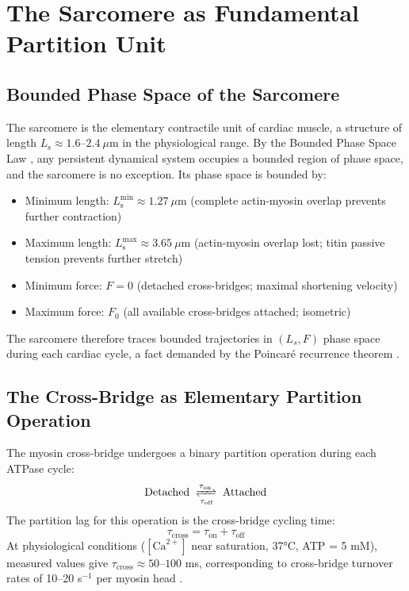 \documentclass[12pt,a4paper]{article}
\theoremstyle{remark}
\newcommand{\taucross}{\tau_{\mathrm{cross}}}
\newcommand{\Ls}{L_{\mathrm{s}}}
\begin{document}
\section{The Sarcomere as Fundamental Partition Unit}
\label{sec:sarcomere}

\subsection{Bounded Phase Space of the Sarcomere}

The sarcomere is the elementary contractile unit of cardiac muscle, a structure of length $\Ls \approx 1.6$--$2.4~\mu\mathrm{m}$ in the physiological range. By the Bounded Phase Space Law \cite{sachikonye2024mass}, any persistent dynamical system occupies a bounded region of phase space, and the sarcomere is no exception. Its phase space is bounded by:
\begin{itemize}
    \item Minimum length: $\Ls^{\min} \approx 1.27~\mu\mathrm{m}$ (complete actin-myosin overlap prevents further contraction)
    \item Maximum length: $\Ls^{\max} \approx 3.65~\mu\mathrm{m}$ (actin-myosin overlap lost; titin passive tension prevents further stretch)
    \item Minimum force: $F = 0$ (detached cross-bridges; maximal shortening velocity)
    \item Maximum force: $F_0$ (all available cross-bridges attached; isometric)
\end{itemize}

The sarcomere therefore traces bounded trajectories in $(L_s, F)$ phase space during each cardiac cycle, a fact demanded by the Poincar\'{e} recurrence theorem \cite{poincare1890}.

\subsection{The Cross-Bridge as Elementary Partition Operation}

The myosin cross-bridge undergoes a binary partition operation during each ATPase cycle:
\begin{equation}
    \text{Detached} \;\xrightleftharpoons[\tau_{\mathrm{off}}]{\tau_{\mathrm{on}}}\; \text{Attached}
\end{equation}
The partition lag for this operation is the cross-bridge cycling time:
\begin{equation}
    \taucross = \tau_{\mathrm{on}} + \tau_{\mathrm{off}}
    \label{eq:tau_cross}
\end{equation}
At physiological conditions ($[\mathrm{Ca}^{2+}]$ near saturation, 37°C, ATP = 5 mM), measured values give $\taucross \approx 50$--$100$ ms, corresponding to cross-bridge turnover rates of 10--20 s$^{-1}$ per myosin head \cite{finer1994single,molloy1995movement}.
\end{document}
